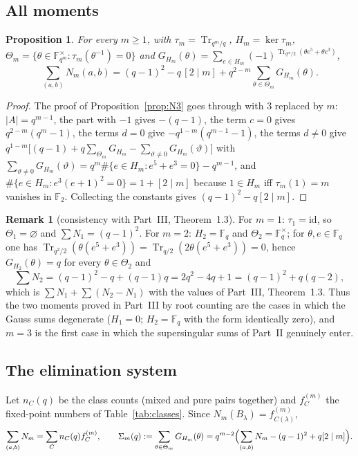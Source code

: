 \documentclass[12pt,a4paper]{amsart}
\newtheorem{proposition}[theorem]{Proposition}
\theoremstyle{definition}
\newtheorem{remark}[theorem]{Remark}
\newcommand{\F}{\mathbb{F}}
\newcommand{\Tr}{\operatorname{Tr}}
\begin{document}
\subsection{All moments}
\begin{proposition}\label{prop:Nm}
For every $m\ge1$, with $\tau_m=\Tr_{q^m/q}$, $H_m=\ker\tau_m$, $\Theta_m=\{\theta\in\F_{q^m}^\times:\tau_m(\theta^{-1})=0\}$ and $G_{H_m}(\theta)=\sum_{e\in H_m}(-1)^{\Tr_{q^m/2}(\theta e^5+\theta e^3)}$,
\[
\sum_{(a,b)}N_m(a,b)=(q-1)^2-q\,[2\mid m]+q^{2-m}\sum_{\theta\in\Theta_m}G_{H_m}(\theta).
\]
\end{proposition}
\begin{proof}
The proof of Proposition~\ref{prop:N3} goes through with $3$ replaced by $m$: $|A|=q^{m-1}$, the part with $-1$ gives $-(q-1)$, the term $c=0$ gives $q^{2-m}(q^m-1)$, the terms $d=0$ give $-q^{1-m}(q^{m-1}-1)$, the terms $d\ne0$ give $q^{1-m}\bigl[(q-1)+q\sum_{\Theta_m}G_{H_m}-\sum_{\vartheta\ne0}G_{H_m}(\vartheta)\bigr]$ with $\sum_{\vartheta\ne0}G_{H_m}(\vartheta)=q^m\#\{e\in H_m:e^5+e^3=0\}-q^{m-1}$, and $\#\{e\in H_m:e^3(e+1)^2=0\}=1+[2\mid m]$ because $1\in H_m$ iff $\tau_m(1)=m$ vanishes in $\F_2$. Collecting the constants gives $(q-1)^2-q[2\mid m]$.
\end{proof}

\begin{remark}[consistency with Part~III, Theorem~1.3]\label{rem:m12}
For $m=1$: $\tau_1=\mathrm{id}$, so $\Theta_1=\varnothing$ and $\sum N_1=(q-1)^2$. For $m=2$: $H_2=\F_q$ and $\Theta_2=\F_q^\times$; for $\theta,e\in\F_q$ one has $\Tr_{q^2/2}(\theta(e^5+e^3))=\Tr_{q/2}(2\theta(e^5+e^3))=0$, hence $G_{H_2}(\theta)=q$ for every $\theta\in\Theta_2$ and
\[
\sum N_2=(q-1)^2-q+(q-1)q=2q^2-4q+1=(q-1)^2+q(q-2),
\]
which is $\sum N_1+\sum(N_2-N_1)$ with the values of Part~III, Theorem~1.3. Thus the two moments proved in Part~III by root counting are the cases in which the Gauss sums degenerate ($H_1=0$; $H_2=\F_q$ with the form identically zero), and $m=3$ is the first case in which the supersingular sums of Part~II genuinely enter.
\end{remark}

\subsection{The elimination system}
Let $n_C(q)$ be the class counts (mixed and pure pairs together) and $f^{(m)}_C$ the fixed-point numbers of Table~\ref{tab:classes}. Since $N_m(B_\lambda)=f^{(m)}_{C(\lambda)}$,
\begin{equation}\label{eq:moments}
\sum_{(a,b)}N_m=\sum_Cn_C(q)f^{(m)}_C,\qquad
\Sigma_m(q):=\sum_{\theta\in\Theta_m}G_{H_m}(\theta)=q^{m-2}\Bigl(\sum_{(a,b)}N_m-(q-1)^2+q[2\mid m]\Bigr).
\end{equation}
\end{document}
